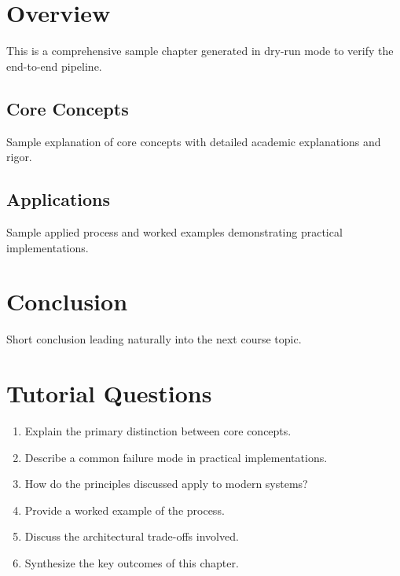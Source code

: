 \documentclass[12pt]{report}
\begin{document}
\section{Overview}
This is a comprehensive sample chapter generated in dry-run mode to verify the end-to-end pipeline.

\subsection{Core Concepts}
Sample explanation of core concepts with detailed academic explanations and rigor.

\subsection{Applications}
Sample applied process and worked examples demonstrating practical implementations.

\section{Conclusion}
Short conclusion leading naturally into the next course topic.

\section*{Tutorial Questions}
\begin{enumerate}
\item Explain the primary distinction between core concepts.
\item Describe a common failure mode in practical implementations.
\item How do the principles discussed apply to modern systems?
\item Provide a worked example of the process.
\item Discuss the architectural trade-offs involved.
\item Synthesize the key outcomes of this chapter.
\end{enumerate}
\end{document}
